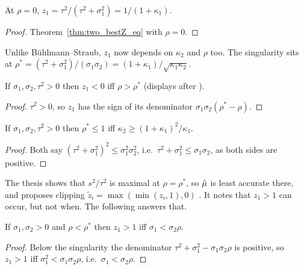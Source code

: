 \begin{corollary}[Bühlmann--Straub at $\rho = 0$]\label{cor:z1_rho_zero}
  \leanok
  At $\rho = 0$, $z_1 = \tau^2/(\tau^2 + \sigma_1^2) = 1/(1 + \kappa_1)$.
\end{corollary}
\begin{proof}
  \leanok
  Theorem~\ref{thm:two_bestZ_eq} with $\rho = 0$.
\end{proof}

Unlike Bühlmann--Straub, $z_1$ now depends on $\kappa_2$ and $\rho$ too. The
singularity sits at
$\rho^* = (\tau^2 + \sigma_1^2)/(\sigma_1\sigma_2) = (1+\kappa_1)/\sqrt{\kappa_1\kappa_2}$.

\begin{theorem}\label{thm:z1_neg_iff}
  \leanok
  If $\sigma_1, \sigma_2, \tau^2 > 0$ then $z_1 < 0$ iff $\rho > \rho^*$
  (displays after ).
\end{theorem}
\begin{proof}
  \leanok
  $\tau^2 > 0$, so $z_1$ has the sign of its denominator
  $\sigma_1\sigma_2(\rho^* - \rho)$.
\end{proof}

\begin{theorem}\label{thm:singularity_reachable_iff}
  \leanok
  If $\sigma_1, \sigma_2, \tau^2 > 0$ then $\rho^* \le 1$ iff
  $\kappa_2 \ge (1 + \kappa_1)^2/\kappa_1$.
\end{theorem}
\begin{proof}
  \leanok
  Both say $(\tau^2 + \sigma_1^2)^2 \le \sigma_1^2\sigma_2^2$, i.e.\
  $\tau^2 + \sigma_1^2 \le \sigma_1\sigma_2$, as both sides are positive.
\end{proof}

The thesis shows that $s^2/\tau^2$  is maximal at $\rho = \rho^*$,
so $\hat\mu$ is least accurate there, and proposes clipping
$\tilde z_i = \max(\min(z_i, 1), 0)$ . It notes that $z_1 > 1$
can occur, but not when. The following answers that.

\begin{theorem}[Credibility above one]\label{thm:z1_gt_one_iff}
  \leanok
  If $\sigma_1, \sigma_2 > 0$ and $\rho < \rho^*$ then
  $z_1 > 1$ iff $\sigma_1 < \sigma_2\rho$.
\end{theorem}
\begin{proof}
  \leanok
  Below the singularity the denominator $\tau^2 + \sigma_1^2 - \sigma_1\sigma_2\rho$
  is positive, so $z_1 > 1$ iff $\sigma_1^2 < \sigma_1\sigma_2\rho$, i.e.\
  $\sigma_1 < \sigma_2\rho$.
\end{proof}

